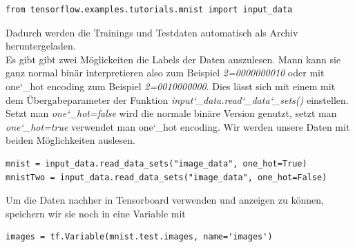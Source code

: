 \begin{lstlisting}
from tensorflow.examples.tutorials.mnist import input_data
\end{lstlisting}
Dadurch werden die Trainings und Testdaten automatisch als Archiv heruntergeladen.\\
Es gibt gibt zwei Möglickeiten die Labels der Daten auszulesen. Mann kann sie ganz normal binär interpretieren also zum Beispiel \emph{2=0000000010} oder mit one\char`_hot encoding zum Beispiel \emph{2=0010000000}. Dies lässt sich mit einem mit dem Übergabeparameter der Funktion \emph{input\char`_data.read\char`_data\char`_sets()} einstellen. Setzt man \emph{one\char`_hot=false} wird die normale binäre Version genutzt, setzt man \emph{one\char`_hot=true} verwendet man one\char`_hot encoding. Wir werden unsere Daten mit beiden Möglichkeiten auslesen.
\lstset{language=Python}
\begin{lstlisting}
mnist = input_data.read_data_sets("image_data", one_hot=True)
mnistTwo = input_data.read_data_sets("image_data", one_hot=False)
\end{lstlisting}
Um die Daten nachher in Tensorboard verwenden und anzeigen zu können, speichern wir sie noch in eine Variable mit
\lstset{language=Python}
\begin{lstlisting}
images = tf.Variable(mnist.test.images, name='images')
\end{lstlisting}
